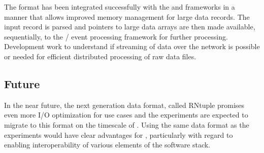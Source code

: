 \documentclass[../main-v1.tex]{subfiles}
\begin{document}
The  format has been integrated successfully with the  and  frameworks in a manner that allows improved memory management for large data records.  The  input  record is parsed and pointers to large data arrays are then made available, sequentially, to the / event processing framework for further processing. Development work to understand if streaming of  data over the network is possible or needed for efficient distributed processing of raw data files.

\subsection{Future }
In the near future, the next generation  data format, called RNtuple  promises even more I/O optimization for  use cases and the  experiments are expected to migrate to this format on the timescale of .  Using the same data format as the  experiments would have clear advantages for , particularly with regard to enabling interoperability of various elements of the software stack.
\end{document}
